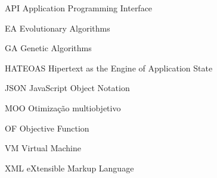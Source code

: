 \begin{siglas}
    \item[API] Application Programming Interface
    \item[EA] Evolutionary Algorithms
    \item[GA] Genetic Algorithms
    \item[HATEOAS] Hipertext as the Engine of Application State
    \item[JSON] JavaScript Object Notation
    \item[MOO] Otimização multiobjetivo
    \item[OF] Objective Function
    \item[VM] Virtual Machine
    \item[XML] eXtensible Markup Language
\end{siglas}
